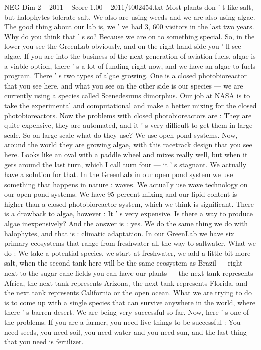 \begin{textsample}{NEG Dim 2 – 2011 – Score 1.00 – 2011/t002454.txt}
Most plants don ' t like salt, but halophytes tolerate salt.
We also are using weeds and we are also using algae.
The good thing about our lab is, we ' ve had 3, 600 visitors in the last two years.
Why do you think that ' s so?
Because we are on to something special.
So, in the lower you see the GreenLab obviously, and on the right hand side you ' ll see algae.
If you are into the business of the next generation of aviation fuels, algae is a viable option, there ' s a lot of funding right now, and we have an algae to fuels program.
There ' s two types of algae growing.
One is a closed photobioreactor that you see here, and what you see on the other side is our species — we are currently using a species called Scenedesmus dimorphus.
Our job at NASA is to take the experimental and computational and make a better mixing for the closed photobioreactors.
Now the problems with closed photobioreactors are : They are quite expensive, they are automated, and it ' s very difficult to get them in large scale.
So on large scale what do they use?
We use open pond systems.
Now, around the world they are growing algae, with this racetrack design that you see here.
Looks like an oval with a paddle wheel and mixes really well, but when it gets around the last turn, which I call turn four — it ' s stagnant.
We actually have a solution for that.
In the GreenLab in our open pond system we use something that happens in nature : waves.
We actually use wave technology on our open pond systems.
We have 95 percent mixing and our lipid content is higher than a closed photobioreactor system, which we think is significant.
There is a drawback to algae, however : It ' s very expensive.
Is there a way to produce algae inexpensively?
And the answer is : yes.
We do the same thing we do with halophytes, and that is : climatic adaptation.
In our GreenLab we have six primary ecosystems that range from freshwater all the way to saltwater.
What we do : We take a potential species, we start at freshwater, we add a little bit more salt, when the second tank here will be the same ecosystem as Brazil — right next to the sugar cane fields you can have our plants — the next tank represents Africa, the next tank represents Arizona, the next tank represents Florida, and the next tank represents California or the open ocean.
What we are trying to do is to come up with a single species that can survive anywhere in the world, where there ' s barren desert.
We are being very successful so far.
Now, here ' s one of the problems.
If you are a farmer, you need five things to be successful : You need seeds, you need soil, you need water and you need sun, and the last thing that you need is fertilizer.

\end{textsample}
